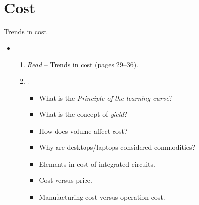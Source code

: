 \section{Cost}

\begin{frame}[t]{Trends in cost}
\begin{itemize}
  \item {}
    \begin{enumerate}
      \item \emph{Read}  -- Trends in cost (pages 29--36).\\
            \bibhennessy

      \item {}:
        \begin{itemize}
          \item What is the \emph{Principle of the learning curve}?
          \item What is the concept of \emph{yield}?
          \item How does volume affect cost?
          \item Why are desktops/laptops considered commodities?
          \item Elements in cost of integrated circuits.
          \item Cost versus price.
          \item Manufacturing cost versus operation cost.
        \end{itemize}
    \end{enumerate}
\end{itemize}
\end{frame}
